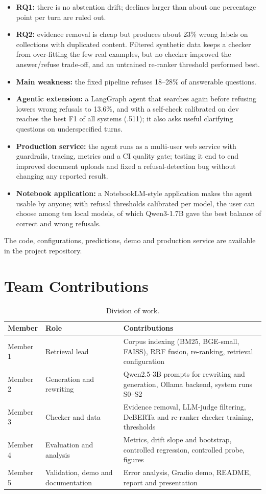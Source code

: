 \documentclass[11pt,a4paper]{report}
\newcommand{\sys}[1]{\textsf{#1}}
\begin{document}
\begin{itemize}
\item \textbf{RQ1:} there is no abstention drift; declines larger than about one percentage point per turn are ruled out.
\item \textbf{RQ2:} evidence removal is cheap but produces about 23\% wrong labels on collections with duplicated content. Filtered synthetic data keeps a checker from over-fitting the few real examples, but no checker improved the answer/refuse trade-off, and an untrained re-ranker threshold performed best.
\item \textbf{Main weakness:} the fixed pipeline refuses 18--28\% of answerable questions.
\item \textbf{Agentic extension:} a LangGraph agent that searches again before refusing lowers wrong refusals to 13.6\%, and with a self-check calibrated on dev reaches the best F1 of all systems (.511); it also asks useful clarifying questions on underspecified turns.
\item \textbf{Production service:} the agent runs as a multi-user web service with guardrails, tracing, metrics and a CI quality gate; testing it end to end improved document uploads and fixed a refusal-detection bug without changing any reported result.
\item \textbf{Notebook application:} a NotebookLM-style application makes the agent usable by anyone; with refusal thresholds calibrated per model, the user can choose among ten local models, of which Qwen3-1.7B gave the best balance of correct and wrong refusals.
\end{itemize}
The code, configurations, predictions, demo and production service are available in the project repository.

\chapter*{Team Contributions}
\begin{table}[H]
\centering\small
\begin{tabularx}{\textwidth}{@{}llY@{}}
\toprule
Member & Role & Contributions \\
\midrule
Member 1 & Retrieval lead & Corpus indexing (BM25, BGE-small, FAISS), RRF fusion, re-ranking, retrieval configuration \\
Member 2 & Generation and rewriting & Qwen2.5-3B prompts for rewriting and generation, Ollama backend, system runs \sys{S0}--\sys{S2} \\
Member 3 & Checker and data & Evidence removal, LLM-judge filtering, DeBERTa and re-ranker checker training, thresholds \\
Member 4 & Evaluation and analysis & Metrics, drift slope and bootstrap, controlled regression, controlled probe, figures \\
Member 5 & Validation, demo and documentation & Error analysis, Gradio demo, README, report and presentation \\
\bottomrule
\end{tabularx}
\caption{Division of work.}
\end{table}
\end{document}
